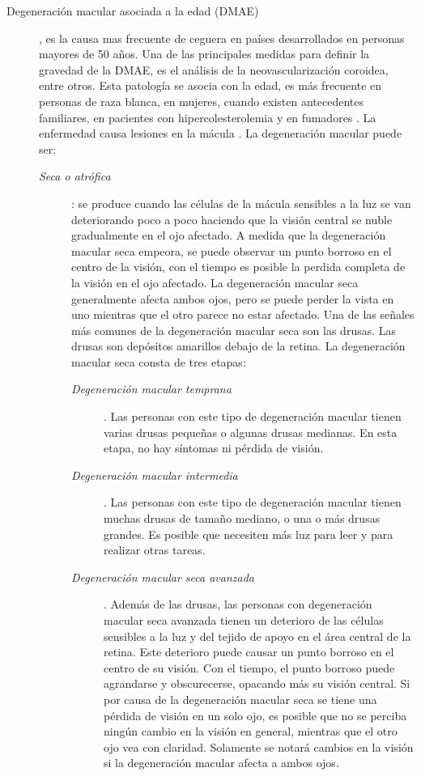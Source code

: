 \begin{description}
\item[Degeneraci\'on macular asociada a la edad (DMAE)] , es la causa mas frecuente de ceguera en pa\'ises desarrollados en personas mayores de 50 a\~nos. Una de las principales medidas para definir la gravedad de la DMAE, es el an\'alisis de la neovascularizaci\'on coroidea, entre otros. Esta patolog\'ia se asocia con la edad, es m\'as frecuente en personas de raza blanca, en mujeres, cuando existen antecedentes familiares, en pacientes con hipercolesterolemia y en fumadores \cite{nei:dmae} \cite{lim2012age}. La enfermedad causa lesiones en la m\'acula \cite{frame1998comparison} \cite{forrester1997fully}. La degeneraci\'on macular puede ser:
\begin{description}
	\item[\normalfont\textit{ Seca o atr\'ofica}]: se produce cuando las c\'elulas de la m\'acula sensibles a la luz se van deteriorando poco a poco haciendo que la visi\'on central se nuble gradualmente en el ojo afectado. A medida que la degeneraci\'on macular seca empeora, se puede observar un punto borroso en el centro de la visi\'on, con el tiempo es posible la perdida completa de la visi\'on en el ojo afectado. La degeneraci\'on macular seca generalmente afecta ambos ojos, pero se puede perder la vista en uno mientras que el otro parece no estar afectado. Una de las señales m\'as comunes de la degeneraci\'on macular seca son las drusas. Las drusas son dep\'ositos amarillos debajo de la retina. La degeneraci\'on macular seca consta de tres etapas:
\begin{description}
\item[\normalfont\textit{Degeneraci\'on macular temprana}]. Las personas con este tipo de degeneraci\'on macular tienen varias drusas pequeñas o algunas drusas medianas. En esta etapa, no hay s\'intomas ni p\'erdida de visi\'on.
\item[\normalfont\textit{Degeneraci\'on macular intermedia}]. Las personas con este tipo de degeneraci\'on macular tienen muchas drusas de tamaño mediano, o una o m\'as drusas grandes. Es posible que necesiten m\'as luz para leer y para realizar otras tareas.
\item[\normalfont\textit{Degeneraci\'on macular seca avanzada}]. Adem\'as de las drusas, las personas con degeneraci\'on macular seca avanzada tienen un deterioro de las c\'elulas sensibles a la luz y del tejido de apoyo en el \'area central de la retina. Este deterioro puede causar un punto borroso en el centro de su visi\'on. Con el tiempo, el punto borroso puede agrandarse y obscurecerse, opacando m\'as su visi\'on central. Si por causa de la degeneraci\'on macular seca se tiene una p\'erdida de visi\'on en un solo ojo, es posible que no se perciba ning\'un cambio en la visi\'on en general, mientras que el otro ojo vea con claridad. Solamente  se notar\'a cambios en la visi\'on si la degeneraci\'on macular afecta a ambos ojos. 

\end{description}
\end{description}
\end{description}
